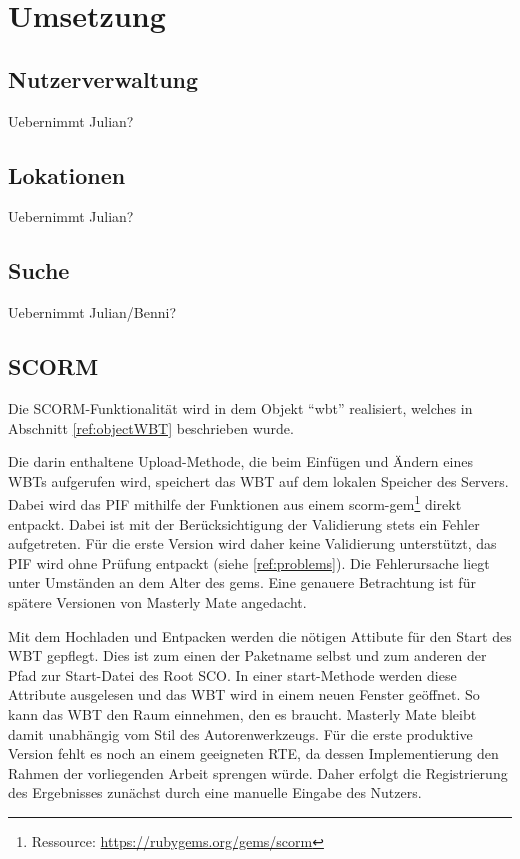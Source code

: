 \chapter{Umsetzung}\label{ref:chaptImplementation}

\section{Nutzerverwaltung}
\begin{k}
Uebernimmt Julian?
\end{k}

\section{Lokationen}
\begin{k}
Uebernimmt Julian?
\end{k}

\section{Suche}
\begin{k}
Uebernimmt Julian/Benni?
\end{k}

\section{SCORM}\label{ref:implSCORM}
Die SCORM-Funktionalität wird in dem Objekt "`wbt"' realisiert, welches in
Abschnitt \ref{ref:objectWBT} beschrieben wurde. 

Die darin enthaltene Upload-Methode, die beim Einfügen und Ändern eines WBTs
aufgerufen wird, speichert das WBT auf dem lokalen Speicher des Servers. Dabei
wird das \ac{PIF} mithilfe der Funktionen aus einem
scorm-gem\footnote{Ressource: \url{https://rubygems.org/gems/scorm}} direkt
entpackt. Dabei ist mit der Berücksichtigung der Validierung stets ein Fehler
aufgetreten. Für die erste Version wird daher keine Validierung unterstützt, das
PIF wird ohne Prüfung entpackt (siehe \ref{ref:problems}). Die Fehlerursache
liegt unter Umständen an dem Alter des gems. Eine genauere Betrachtung ist für
spätere Versionen von Masterly Mate angedacht. 

Mit dem Hochladen und Entpacken werden die nötigen Attibute für den Start des
WBT gepflegt. Dies ist zum einen der Paketname selbst und zum anderen der Pfad
zur Start-Datei des Root SCO. In einer start-Methode werden diese Attribute
ausgelesen und das WBT wird in einem neuen Fenster geöffnet. So kann das WBT den
Raum einnehmen, den es braucht. Masterly Mate bleibt damit unabhängig vom Stil
des Autorenwerkzeugs. Für die erste produktive Version fehlt es noch an einem
geeigneten RTE, da dessen Implementierung den Rahmen der vorliegenden Arbeit
sprengen würde. Daher erfolgt die Registrierung des Ergebnisses zunächst durch
eine manuelle Eingabe des Nutzers.

